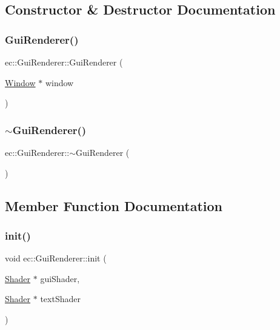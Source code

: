 \subsection{Constructor \& Destructor Documentation}
\mbox{\label{classec_1_1_gui_renderer_a2b48bf69434fbc2a4aa47f31a2603e50}} 
\subsubsection{\texorpdfstring{Gui\+Renderer()}{GuiRenderer()}}
{\footnotesize\ttfamily ec\+::\+Gui\+Renderer\+::\+Gui\+Renderer (\begin{DoxyParamCaption}\item[{\mbox{\hyperlink{classec_1_1_window}{Window}} $\ast$}]{window }\end{DoxyParamCaption})\hspace{0.3cm}{\ttfamily [explicit]}}

\mbox{\label{classec_1_1_gui_renderer_a0c19871dcb1bed759cae2ab7f2780938}} 
\subsubsection{\texorpdfstring{$\sim$\+Gui\+Renderer()}{~GuiRenderer()}}
{\footnotesize\ttfamily ec\+::\+Gui\+Renderer\+::$\sim$\+Gui\+Renderer (\begin{DoxyParamCaption}{ }\end{DoxyParamCaption})\hspace{0.3cm}{\ttfamily [default]}}



\subsection{Member Function Documentation}
\mbox{\label{classec_1_1_gui_renderer_a599aa00ab13fda4c9a26221a9359a10f}} 
\subsubsection{\texorpdfstring{init()}{init()}}
{\footnotesize\ttfamily void ec\+::\+Gui\+Renderer\+::init (\begin{DoxyParamCaption}\item[{\mbox{\hyperlink{classec_1_1_shader}{Shader}} $\ast$}]{gui\+Shader,  }\item[{\mbox{\hyperlink{classec_1_1_shader}{Shader}} $\ast$}]{text\+Shader }\end{DoxyParamCaption})}

